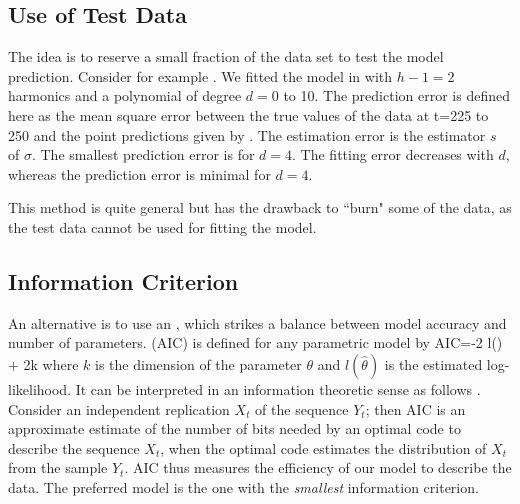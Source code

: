 \subsection{Use of Test Data} The
idea is to reserve a small fraction of the data set to test the
model prediction. Consider for example
. We fitted the model in
 with $h-1=2$ harmonics and a polynomial
of degree $d=0$ to 10. The prediction error is defined here as the
mean square error between the true values of the data at t=225 to
250 and the point predictions given by . The
estimation error is the estimator $s$ of $\sigma$. The smallest
prediction error is for $d=4$. The fitting error decreases with $d$,
whereas the prediction error is minimal for $d=4$.
\begin{figure}[!htbp]
\end{figure}
This method is quite general but has the drawback to ``burn" some of
the data, as the test data cannot be used for fitting the model.
%
\subsection{Information Criterion}
\label{sec-ic}An alternative is to use an
, which strikes a balance
between model accuracy and number of parameters.
%
 (AIC) is defined for any parametric model by
 \be
 \mbox{AIC}=-2 l(\hat{\theta}) + 2k
\ee
 where $k$ is
the dimension of the parameter $\theta$ and $l(\hat{\theta})$
is the estimated log-likelihood. It can be interpreted in an
information theoretic sense as follows \cite[Section
7.3]{weber-ts}. Consider an independent replication $X_t$ of
the sequence $Y_t$; then AIC is an approximate estimate of the number
of bits needed by an optimal code to describe the sequence
$X_t$, when the optimal code estimates the distribution of
$X_t$ from the sample $Y_t$. AIC thus measures the efficiency
of our model to describe the data. The preferred model is the
one with the \emph{smallest} information criterion.

